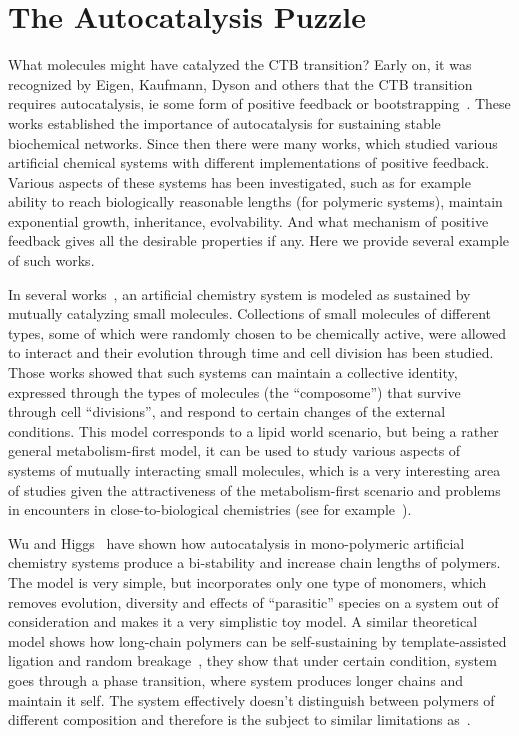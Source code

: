 \documentclass[journal=jacsat,manuscript=article,layout=twocolumn]{achemso}
\begin{document}
 \section{The Autocatalysis Puzzle}
 
 What molecules might have catalyzed the CTB transition?  Early on, it was recognized by Eigen, 
Kaufmann, Dyson and others that the CTB transition requires autocatalysis, ie some form of positive 
feedback or 
bootstrapping~\cite{Eigen1978,Dyson1985,Prigogine1989,Kauffman1986}.  These works established the 
importance of autocatalysis for sustaining stable biochemical networks. Since then there were many 
works, which studied various artificial chemical systems with different implementations of positive 
feedback. Various aspects of these systems has been investigated, such as for example ability to 
reach biologically reasonable lengths (for polymeric systems), maintain exponential growth, 
inheritance, evolvability. And what mechanism of positive feedback gives all the desirable 
properties if any. Here we provide several example of such works. 

In several works~\cite{segre1998graded,Segre2000,Markovitch2012}, an artificial chemistry system is 
modeled as sustained by mutually 
catalyzing small molecules. Collections of small molecules of different types, some of which were 
randomly chosen to be chemically active, were allowed to interact and their evolution through time 
and cell division has been studied. Those works showed that such systems can maintain a 
collective identity, expressed through the types of molecules (the ``composome'') that survive 
through cell ``divisions'', and respond to certain changes of the external conditions. This model 
corresponds to a lipid world scenario, but being a rather general metabolism-first model, it can be 
used to study various aspects of systems of mutually interacting small molecules, which is a very 
interesting area of studies given the attractiveness of the metabolism-first scenario and problems 
in encounters in close-to-biological chemistries (see for example~\cite{Orgel2008a}).

Wu and Higgs~\cite{Wu2009} have shown how autocatalysis in mono-polymeric artificial chemistry 
systems produce a 
bi-stability and increase chain lengths of polymers. The model is very simple, but incorporates 
only one type of monomers, which removes evolution, diversity and effects of ``parasitic'' species 
on a system out of consideration and makes it a very simplistic toy model.  A similar theoretical 
model shows how long-chain polymers can be self-sustaining by template-assisted  ligation and random 
breakage~\cite{Tkachenko2014}, they show that under certain condition, system goes through a phase 
transition, where system produces longer chains and maintain it self. The system effectively doesn't 
distinguish between polymers of different composition and therefore is the subject to similar 
limitations as~\cite{Wu2009}.
\end{document}

